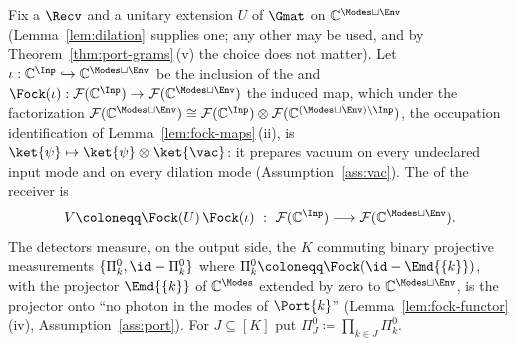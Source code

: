 
\begin{definition}\label{def:physmodel}
Fix a  $\Recv$ and a unitary extension $U$ of $\Gmat$
on $\mathbb{C}^{\Modes\sqcup\Env}$ (Lemma~\ref{lem:dilation} supplies one; any
other may be used, and by Theorem~\ref{thm:port-grams}\,(v) the choice does not
matter). Let
$\iota:\mathbb{C}^{\Inp}\hookrightarrow\mathbb{C}^{\Modes\sqcup\Env}$ be the
inclusion of the  and
$\Fock(\iota):\mathcal{F}(\mathbb{C}^{\Inp})\to
\mathcal{F}(\mathbb{C}^{\Modes\sqcup\Env})$ the induced map, which under the
factorization
$\mathcal{F}(\mathbb{C}^{\Modes\sqcup\Env})\cong
 \mathcal{F}(\mathbb{C}^{\Inp})\otimes
 \mathcal{F}(\mathbb{C}^{(\Modes\sqcup\Env)\setminus\Inp})$, the occupation
identification of Lemma~\ref{lem:fock-maps}\,(ii),
is $\ket{\psi}\mapsto\ket{\psi}\otimes\ket{\vac}$: it prepares vacuum on every
undeclared input mode and on every dilation mode
(Assumption~\ref{ass:vac}). The  of the receiver is
\begin{equation}\label{eq:measisometry}
  V\coloneqq\Fock(U)\,\Fock(\iota)
  \ :\ \mathcal{F}(\mathbb{C}^{\Inp})\longrightarrow
        \mathcal{F}(\mathbb{C}^{\Modes\sqcup\Env}) .
\end{equation}
The detectors measure, on the output side, the $K$ commuting binary projective
measurements $\{\Pi^{0}_{k},\id-\Pi^{0}_{k}\}$ where
$\Pi^0_k\coloneqq\Fock(\id-\Emd{\{k\}})$, with the projector $\Emd{\{k\}}$ of
$\mathbb{C}^{\Modes}$ extended by zero to $\mathbb{C}^{\Modes\sqcup\Env}$, is
the projector onto ``no photon in the modes of $\Port{k}$''
(Lemma~\ref{lem:fock-functor}\,(iv), Assumption~\ref{ass:port}). For $J\subseteq[K]$ put
$\Pi^0_J\coloneqq\prod_{k\in J}\Pi^0_k$.
\end{definition}
